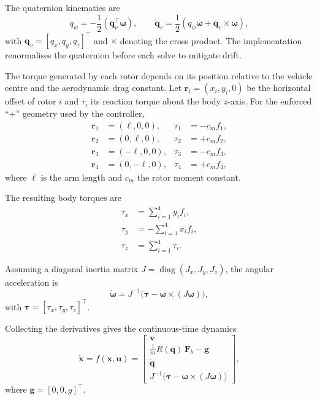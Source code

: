 \documentclass[11pt,a4paper]{article}
\begin{document}
The quaternion kinematics are
\begin{equation}
    \dot{q}_w = -\frac{1}{2} (\bm{q}_v^\top \bm{\omega}), \qquad
    \dot{\bm{q}}_v = \frac{1}{2} \left( q_w \bm{\omega} + \bm{q}_v \times \bm{\omega} \right),
\end{equation}
with $\bm{q}_v = [q_x, q_y, q_z]^\top$ and $\times$ denoting the cross product. The implementation renormalises the quaternion before each solve to mitigate drift.

The torque generated by each rotor depends on its position relative to the vehicle centre and the aerodynamic drag constant. Let $\bm{r}_i = (x_i, y_i, 0)$ be the horizontal offset of rotor $i$ and $\tau_i$ its reaction torque about the body $z$-axis. For the enforced ``+'' geometry used by the controller,
\begin{align}
    \bm{r}_1 &= (\ell, 0, 0), & \tau_1 &= -c_m f_1, \\
    \bm{r}_2 &= (0, \ell, 0), & \tau_2 &= +c_m f_2, \\
    \bm{r}_3 &= (-\ell, 0, 0), & \tau_3 &= -c_m f_3, \\
    \bm{r}_4 &= (0, -\ell, 0), & \tau_4 &= +c_m f_4,
\end{align}
where $\ell$ is the arm length and $c_m$ the rotor moment constant.

The resulting body torques are
\begin{align}
    \tau_x &= \sum_{i=1}^4 y_i f_i, \\
    \tau_y &= -\sum_{i=1}^4 x_i f_i, \\
    \tau_z &= \sum_{i=1}^4 \tau_i.
\end{align}

Assuming a diagonal inertia matrix $J = \operatorname{diag}(J_x, J_y, J_z)$, the angular acceleration is
\begin{equation}
    \dot{\bm{\omega}} = J^{-1} \Big( \bm{\tau} - \bm{\omega} \times (J\bm{\omega}) \Big),
\end{equation}
with $\bm{\tau} = [\tau_x, \tau_y, \tau_z]^\top$.

Collecting the derivatives gives the continuous-time dynamics
\begin{equation}
    \dot{\bm{x}} = f(\bm{x}, \bm{u}) =
    \begin{bmatrix}
        \bm{v} \\
        \frac{1}{m} R(\bm{q})\,\bm{F}_b - \bm{g} \\
        \dot{\bm{q}} \\
        J^{-1} \Big( \bm{\tau} - \bm{\omega} \times (J\bm{\omega}) \Big)
    \end{bmatrix},
\end{equation}
where $\bm{g} = [0, 0, g]^\top$.
\end{document}
